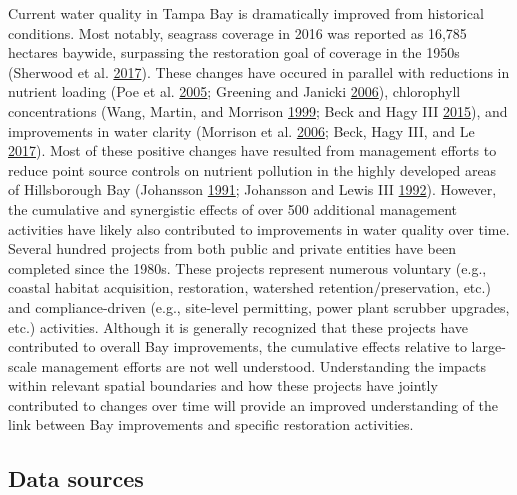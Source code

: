 \documentclass[]{article}
\begin{document}
Current water quality in Tampa Bay is dramatically improved from
historical conditions. Most notably, seagrass coverage in 2016 was
reported as 16,785 hectares baywide, surpassing the restoration goal of
coverage in the 1950s (Sherwood et al.
\protect\hyperlink{ref-Sherwood17}{2017}). These changes have occured in
parallel with reductions in nutrient loading (Poe et al.
\protect\hyperlink{ref-Poe05}{2005}; Greening and Janicki
\protect\hyperlink{ref-Greening06}{2006}), chlorophyll concentrations
(Wang, Martin, and Morrison \protect\hyperlink{ref-Wang99}{1999}; Beck
and Hagy III \protect\hyperlink{ref-Beck15}{2015}), and improvements in
water clarity (Morrison et al. \protect\hyperlink{ref-Morrison06}{2006};
Beck, Hagy III, and Le \protect\hyperlink{ref-Beck17c}{2017}). Most of
these positive changes have resulted from management efforts to reduce
point source controls on nutrient pollution in the highly developed
areas of Hillsborough Bay (Johansson
\protect\hyperlink{ref-Johansson91}{1991}; Johansson and Lewis III
\protect\hyperlink{ref-Johansson92}{1992}). However, the cumulative and
synergistic effects of over 500 additional management activities have
likely also contributed to improvements in water quality over time.
Several hundred projects from both public and private entities have been
completed since the 1980s. These projects represent numerous voluntary
(e.g., coastal habitat acquisition, restoration, watershed
retention/preservation, etc.) and compliance-driven (e.g., site-level
permitting, power plant scrubber upgrades, etc.) activities. Although it
is generally recognized that these projects have contributed to overall
Bay improvements, the cumulative effects relative to large-scale
management efforts are not well understood. Understanding the impacts
within relevant spatial boundaries and how these projects have jointly
contributed to changes over time will provide an improved understanding
of the link between Bay improvements and specific restoration
activities.

\hypertarget{data-sources}{%
\subsection{Data sources}\label{data-sources}}
\end{document}
